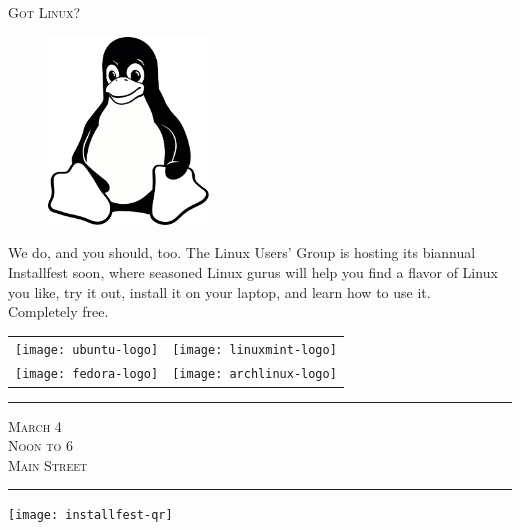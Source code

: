 \documentclass[12pt]{article}
\begin{document}
\pagestyle{empty}

\begin{center} \LARGE \scshape
    Got Linux?
\end{center}

\begin{figure}
    \vspace{-2em} %
    \begin{center}
        \includegraphics[width=0.38\textwidth]{tux-bw}
    \end{center}
    \vspace{-2em} %
\end{figure}

{\small%

    We do, and you should, too. The Linux Users' Group is hosting its biannual
    Installfest soon, where seasoned Linux gurus will help you find a flavor of
    Linux you like, try it out, install it on your laptop, and learn how to use
    it.\\
    Completely free.

}

\begin{center}
\begin{tabular}{SS}
    \texttt{[image: ubuntu-logo]} &
    \texttt{[image: linuxmint-logo]} \\
    \texttt{[image: fedora-logo]} &
    \texttt{[image: archlinux-logo]} \\
\end{tabular}

\begin{minipage}[bt]{0.58\textwidth}
    \begin{center}
        \hrule{}
        \vspace{1em}
        {\large \scshape%
            March 4 \\[0em]
            Noon to 6 \\[0em]
            Main Street \\[0em]
        }
        \vspace{1em}
        \hrule{}
    \end{center}
\end{minipage}
\begin{minipage}[bt]{0.38\textwidth}
    \begin{center}
        \texttt{[image: installfest-qr]}
    \end{center}
\end{minipage}
\end{center}
\end{document}

